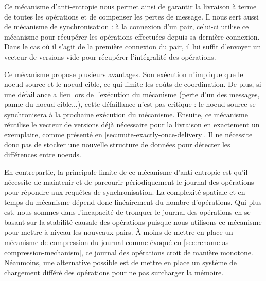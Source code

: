 Ce mécanisme d'anti-entropie nous permet ainsi de garantir la livraison à terme de toutes les opérations et de compenser les pertes de message.
Il nous sert aussi de mécanisme de synchronisation : à la connexion d'un pair, celui-ci utilise ce mécanisme pour récupérer les opérations effectuées depuis sa dernière connexion.
Dans le cas où il s'agit de la première connexion du pair, il lui suffit d'envoyer un vecteur de versions vide pour récupérer l'intégralité des opérations.

Ce mécanisme propose plusieurs avantages.
Son exécution n'implique que le noeud source et le noeud cible, ce qui limite les coûts de coordination.
De plus, si une défaillance a lieu lors de l'exécution du mécanisme (perte d'un des messages, panne du noeud cible...), cette défaillance n'est pas critique : le noeud source se synchronisera à la prochaine exécution du mécanisme.
Ensuite, ce mécanisme réutilise le vecteur de versions déjà nécessaire pour la livraison en exactement un exemplaire, comme présenté en \autoref{sec:mute-exactly-once-delivery}.
Il ne nécessite donc pas de stocker une nouvelle structure de données pour détecter les différences entre noeuds.

En contrepartie, la principale limite de ce mécanisme d'anti-entropie est qu'il nécessite de maintenir et de parcourir périodiquement le journal des opérations pour répondre aux requêtes de synchronisation.
La complexité spatiale et en temps du mécanisme dépend donc linéairement du nombre d'opérations.
Qui plus est, nous sommes dans l'incapacité de tronquer le journal des opérations en se basant sur la stabilité causale des opérations puisque nous utilisons ce mécanisme pour mettre à niveau les nouveaux pairs.
À moins de mettre en place un mécanisme de compression du journal comme évoqué en \autoref{sec:rename-as-compression-mechanism}, ce journal des opérations croit de manière monotone.
Néanmoins, une alternative possible est de mettre en place un système de chargement différé des opérations pour ne pas surcharger la mémoire.
